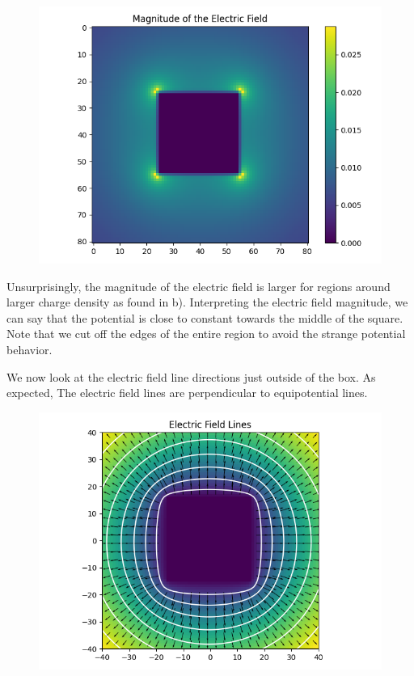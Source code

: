 \documentclass[]{article}
\begin{document}
\begin{figure}[h!]
	\centering
	\includegraphics[width=0.45\linewidth]{../Results/2c2.png}
\end{figure}
Unsurprisingly, the magnitude of the electric field is larger for regions around larger charge density as found in b). Interpreting the electric field magnitude, we can say that the potential is close to constant towards the middle of the square. Note that we cut off the edges of the entire region to avoid the strange potential behavior.

We now look at the electric field line directions just outside of the box. As expected, The electric field lines are perpendicular to equipotential lines.

\begin{figure}[h!]
	\centering
	\includegraphics[width=0.45\linewidth]{../Results/2c3.png}
\end{figure}
\end{document}
